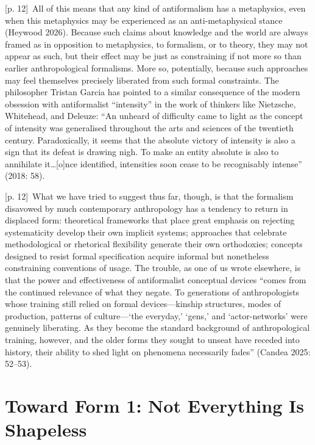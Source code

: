 \documentclass[10pt,a4paper]{article}
\begin{document}
{\scriptsize\color{gray} [p. 12]}\ All of this means that any kind of antiformalism has a metaphysics, even when this metaphysics may be experienced as an anti-metaphysical stance (Heywood 2026). Because such claims about knowledge and the world are always framed as in opposition to metaphysics, to formalism, or to theory, they may not appear as such, but their effect may be just as constraining if not more so than earlier anthropological formalisms. More so, potentially, because such approaches may feel themselves precisely liberated from such formal constraints. The philosopher Tristan Garcia has pointed to a similar consequence of the modern obsession with antiformalist “intensity” in the work of thinkers like Nietzsche, Whitehead, and Deleuze: “An unheard of difficulty came to light as the concept of intensity was generalised throughout the arts and sciences of the twentieth century. Paradoxically, it seems that the absolute victory of intensity is also a sign that its defeat is drawing nigh. To make an entity absolute is also to annihilate it…[o]nce identified, intensities soon cease to be recognisably intense” (2018: 58).\par
{\scriptsize\color{gray} [p. 12]}\ What we have tried to suggest thus far, though, is that the formalism disavowed by much contemporary anthropology has a tendency to return in displaced form: theoretical frameworks that place great emphasis on rejecting systematicity develop their own implicit systems; approaches that celebrate methodological or rhetorical flexibility generate their own orthodoxies; concepts designed to resist formal specification acquire informal but nonetheless constraining conventions of usage. The trouble, as one of us wrote elsewhere, is that the power and effectiveness of antiformalist conceptual devices “comes from the continued relevance of what they negate. To generations of anthropologists whose training still relied on formal devices—kinship structures, modes of production, patterns of culture—‘the everyday,’ ‘gens,’ and ‘actor-networks’ were genuinely liberating. As they become the standard background of anthropological training, however, and the older forms they sought to unseat have receded into history, their ability to shed light on phenomena necessarily fades” (Candea 2025: 52–53).\par
{}\section*{Toward Form 1: Not Everything Is Shapeless}
\end{document}
